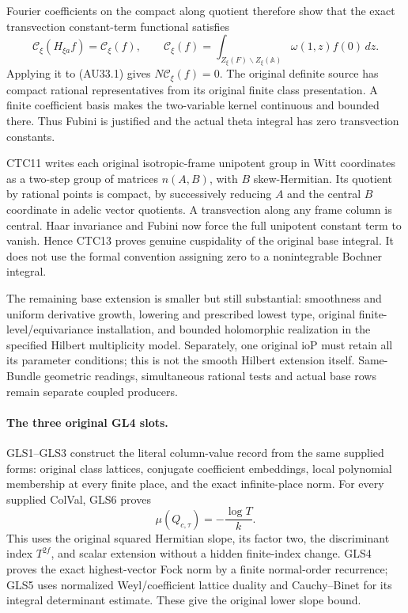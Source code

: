 Fourier coefficients on the compact along quotient therefore show
that the exact transvection constant-term functional satisfies
\[
 \mathcal C_\xi(H_{\xi a}f)=\mathcal C_\xi(f),\qquad
 \mathcal C_\xi(f)=\int_{Z_\xi(F)\backslash Z_\xi(\mathbb A)}
                                     \omega(1,z)f(0)\,dz.
 \tag{AU33.2}
\]
Applying it to (AU33.1) gives $N\mathcal C_\xi(f)=0$.
The original definite source has compact rational representatives
from its original finite class presentation. A finite coefficient
basis makes the two-variable kernel continuous and bounded there.
Thus Fubini is justified and the actual theta integral has zero
transvection constants.

CTC11 writes each original isotropic-frame unipotent group in Witt
coordinates as a two-step group of matrices $n(A,B)$, with $B$
skew-Hermitian. Its quotient by rational points is compact, by
successively reducing $A$ and the central $B$ coordinate in adelic
vector quotients. A transvection along any frame column is central.
Haar invariance and Fubini now force the full unipotent constant
term to vanish. Hence CTC13 proves genuine cuspidality of the
original base integral. It does not use the formal convention
assigning zero to a nonintegrable Bochner integral.

The remaining base extension is smaller but still substantial:
smoothness and uniform derivative growth, lowering and prescribed
lowest type, original finite-level/equivariance installation, and
bounded holomorphic realization in the specified Hilbert
multiplicity model. Separately, one original $\mathrm{ioP}$ must retain all
its parameter conditions; this is not the smooth Hilbert extension itself. Same-Bundle geometric readings,
simultaneous rational tests and actual base rows remain separate
coupled producers.

\paragraph{The three original GL4 slots.}
GLS1--GLS3 construct the literal column-value record from the same
supplied forms: original class lattices, conjugate coefficient
embeddings, local polynomial membership at every finite place,
and the exact infinite-place norm. For every supplied ColVal,
GLS6 proves
\[
                     \mu(Q_{c,\tau})=-\frac{\log T}{k}.
 \tag{AU33.3}
\]
This uses the original squared Hermitian slope, its factor two,
the discriminant index $T^{2f}$, and scalar extension without a
hidden finite-index change. GLS4 proves the exact highest-vector
Fock norm by a finite normal-order recurrence; GLS5 uses normalized
Weyl/coefficient lattice duality and Cauchy--Binet for its integral
determinant estimate. These give the original lower slope bound.

